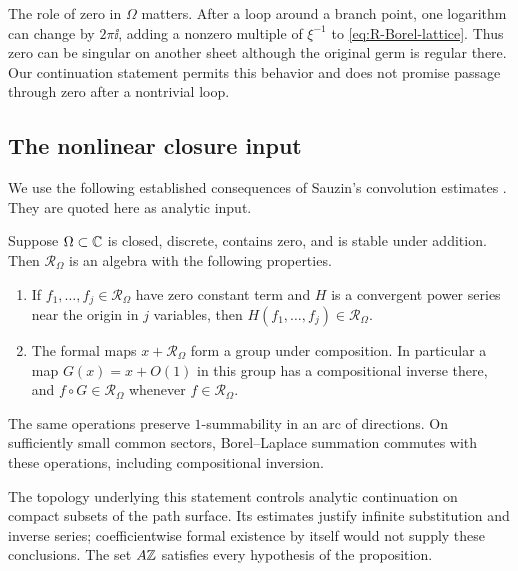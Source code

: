 The role of zero in $\Omega$ matters. After a loop around a branch point,
one logarithm can change by $2\pi\ii$, adding a nonzero multiple of
$\xi^{-1}$ to \eqref{eq:R-Borel-lattice}. Thus zero can be singular on
another sheet although the original germ is regular there. Our continuation
statement permits this behavior and does not promise passage through zero
after a nontrivial loop.

\subsection{The nonlinear closure input}

We use the following established consequences of Sauzin's convolution
estimates \cite[Theorems 3 and 5, and their summable counterparts
$3'$ and $5'$]{Sauzin2015}. They are quoted here as analytic input.

\begin{proposition}
\label{prop:Sauzin-input}
Suppose $\Omega\subset\mathbb C$ is closed, discrete, contains zero, and is stable
under addition. Then $\mathcal R_\Omega$ is an algebra with the following
properties.
\begin{enumerate}
 \item If $f_1,\ldots,f_j\in\mathcal R_\Omega$ have zero constant term
 and $H$ is a convergent power series near the origin in $j$ variables,
 then $H(f_1,\ldots,f_j)\in\mathcal R_\Omega$.
 \item The formal maps $x+\mathcal R_\Omega$ form a group under
 composition. In particular a map $G(x)=x+O(1)$ in this group has a
 compositional inverse there, and $f\circ G\in\mathcal R_\Omega$
 whenever $f\in\mathcal R_\Omega$.
\end{enumerate}
The same operations preserve $1$-summability in an arc of directions.
On sufficiently small common sectors, Borel--Laplace summation commutes
with these operations, including compositional inversion.
\end{proposition}

The topology underlying this statement controls analytic continuation on
compact subsets of the path surface. Its estimates justify infinite
substitution and inverse series; coefficientwise formal existence by itself
would not supply these conclusions. The set $A\mathbb Z$ satisfies every
hypothesis of the proposition.

